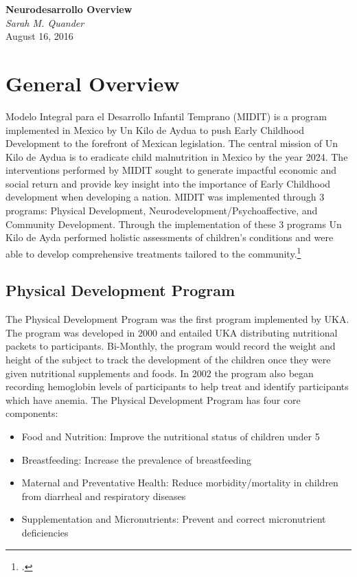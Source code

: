 \documentclass{article}
\begin{document}
   \begin{center}
      \Large\textbf{Neurodesarrollo Overview}\\
      \large\textit{Sarah M. Quander} \\
      \large{August 16, 2016}
   \end{center}

\section{General Overview}
Modelo Integral para el Desarrollo Infantil Temprano (MIDIT) is a program implemented in Mexico by Un Kilo de Aydua to push Early Childhood Development to the forefront of Mexican legislation. The central mission of Un Kilo de Aydua is to eradicate child malnutrition in Mexico by the year 2024. The interventions performed by MIDIT sought to generate impactful economic and social return and provide key insight into the importance of Early Childhood development when developing a nation. MIDIT was implemented through 3 programs: Physical Development, Neurodevelopment/Psychoaffective, and Community Development. Through the implementation of these 3 programs Un Kilo de Ayda performed holistic assessments of children's conditions and were able to develop comprehensive treatments tailored to the community.\footnote{\citet{informeanual2014}.} 

\subsection{Physical Development Program}
The Physical Development Program was the first program implemented by UKA. The program was developed in 2000 and entailed UKA distributing nutritional packets to participants. Bi-Monthly, the program would record the weight and height of the subject to track the development of the children once they were given nutritional supplements and foods. In 2002 the program also began recording hemoglobin levels of participants to help treat and identify participants which have anemia. The Physical Development Program has four core components:
\begin{itemize}
\item Food and Nutrition: Improve the nutritional status of children under 5
\item Breastfeeding: Increase the prevalence of breastfeeding 
\item Maternal and Preventative Health: Reduce morbidity/mortality in children from diarrheal and respiratory diseases
\item Supplementation and Micronutrients: Prevent and correct micronutrient deficiencies  
\end{itemize}
\end{document}

